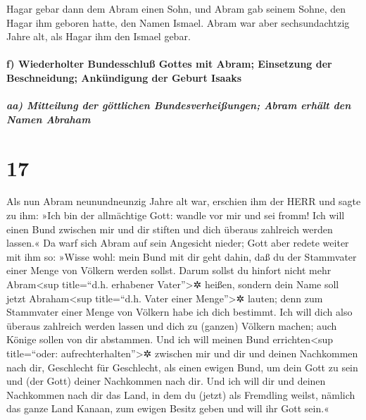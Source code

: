  Hagar gebar dann dem Abram einen Sohn, und Abram gab
seinem Sohne, den Hagar ihm geboren hatte, den Namen Ismael.
 Abram war aber sechsundachtzig Jahre alt, als Hagar ihm
den Ismael gebar.

\hypertarget{f-wiederholter-bundesschluuxdf-gottes-mit-abram-einsetzung-der-beschneidung-ankuxfcndigung-der-geburt-isaaks}{%
\paragraph{f) Wiederholter Bundesschluß Gottes mit Abram; Einsetzung der
Beschneidung; Ankündigung der Geburt
Isaaks}\label{f-wiederholter-bundesschluuxdf-gottes-mit-abram-einsetzung-der-beschneidung-ankuxfcndigung-der-geburt-isaaks}}

\hypertarget{aa-mitteilung-der-guxf6ttlichen-bundesverheiuxdfungen-abram-erhuxe4lt-den-namen-abraham}{%
\subparagraph{aa) Mitteilung der göttlichen Bundesverheißungen; Abram
erhält den Namen
Abraham}\label{aa-mitteilung-der-guxf6ttlichen-bundesverheiuxdfungen-abram-erhuxe4lt-den-namen-abraham}}

\hypertarget{section-16}{%
\section{17}\label{section-16}}

 Als nun Abram neunundneunzig Jahre alt war, erschien ihm
der HERR und sagte zu ihm: »Ich bin der allmächtige Gott: wandle vor mir
und sei fromm!  Ich will einen Bund zwischen mir und dir
stiften und dich überaus zahlreich werden lassen.«  Da
warf sich Abram auf sein Angesicht nieder; Gott aber redete weiter mit
ihm so:  »Wisse wohl: mein Bund mit dir geht dahin, daß du
der Stammvater einer Menge von Völkern werden sollst. 
Darum sollst du hinfort nicht mehr Abram\textless sup title=``d.h.
erhabener Vater''\textgreater✲ heißen, sondern dein Name soll jetzt
Abraham\textless sup title=``d.h. Vater einer Menge''\textgreater✲
lauten; denn zum Stammvater einer Menge von Völkern habe ich dich
bestimmt.  Ich will dich also überaus zahlreich werden
lassen und dich zu (ganzen) Völkern machen; auch Könige sollen von dir
abstammen.  Und ich will meinen Bund
errichten\textless sup title=``oder: aufrechterhalten''\textgreater✲
zwischen mir und dir und deinen Nachkommen nach dir, Geschlecht für
Geschlecht, als einen ewigen Bund, um dein Gott zu sein und (der Gott)
deiner Nachkommen nach dir.  Und ich will dir und deinen
Nachkommen nach dir das Land, in dem du (jetzt) als Fremdling weilst,
nämlich das ganze Land Kanaan, zum ewigen Besitz geben und will ihr Gott
sein.«

